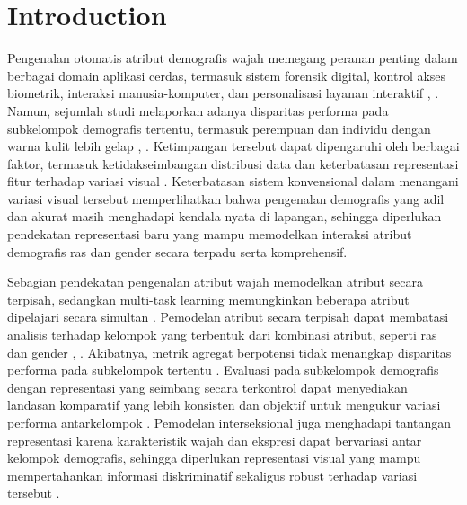 \section{Introduction}
\label{sec:introduction}

Pengenalan otomatis atribut demografis wajah memegang peranan penting dalam berbagai domain aplikasi cerdas, termasuk sistem forensik digital, kontrol akses biometrik, interaksi manusia-komputer, dan personalisasi layanan interaktif \cite{ref1}, \cite{ref2}. Namun, sejumlah studi melaporkan adanya disparitas performa pada subkelompok demografis tertentu, termasuk perempuan dan individu dengan warna kulit lebih gelap \cite{ref3}, \cite{ref4}. Ketimpangan tersebut dapat dipengaruhi oleh berbagai faktor, termasuk ketidakseimbangan distribusi data dan keterbatasan representasi fitur terhadap variasi visual \cite{ref5}. Keterbatasan sistem konvensional dalam menangani variasi visual tersebut memperlihatkan bahwa pengenalan demografis yang adil dan akurat masih menghadapi kendala nyata di lapangan, sehingga diperlukan pendekatan representasi baru yang mampu memodelkan interaksi atribut demografis ras dan gender secara terpadu serta komprehensif.

Sebagian pendekatan pengenalan atribut wajah memodelkan atribut secara terpisah, sedangkan multi-task learning memungkinkan beberapa atribut dipelajari secara simultan \cite{ref6}. Pemodelan atribut secara terpisah dapat membatasi analisis terhadap kelompok yang terbentuk dari kombinasi atribut, seperti ras dan gender \cite{ref7}, \cite{ref8}. Akibatnya, metrik agregat berpotensi tidak menangkap disparitas performa pada subkelompok tertentu \cite{ref9}. Evaluasi pada subkelompok demografis dengan representasi yang seimbang secara terkontrol dapat menyediakan landasan komparatif yang lebih konsisten dan objektif untuk mengukur variasi performa antarkelompok \cite{ref9}. Pemodelan interseksional juga menghadapi tantangan representasi karena karakteristik wajah dan ekspresi dapat bervariasi antar kelompok demografis, sehingga diperlukan representasi visual yang mampu mempertahankan informasi diskriminatif sekaligus robust terhadap variasi tersebut \cite{ref10}.


